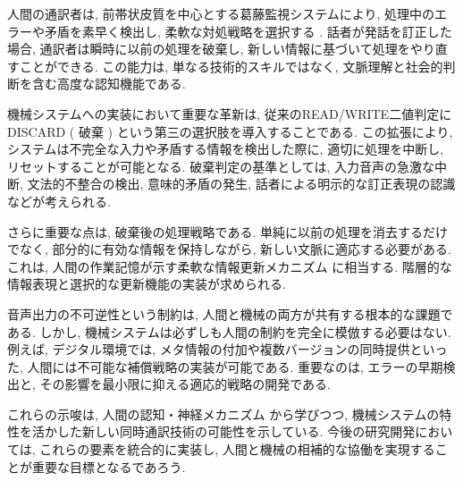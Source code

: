 人間の通訳者は, 前帯状皮質を中心とする葛藤監視システムにより, 処理中のエラーや矛盾を素早く検出し, 柔軟な対処戦略を選択する \cite{hervais2015fmri}.
話者が発話を訂正した場合, 通訳者は瞬時に以前の処理を破棄し, 新しい情報に基づいて処理をやり直すことができる.
この能力は, 単なる技術的スキルではなく, 文脈理解と社会的判断を含む高度な認知機能である.

機械システムへの実装において重要な革新は, 従来のREAD/WRITE二値判定にDISCARD ( 破棄 ) という第三の選択肢を導入することである.
この拡張により, システムは不完全な入力や矛盾する情報を検出した際に, 適切に処理を中断し, リセットすることが可能となる.
破棄判定の基準としては, 入力音声の急激な中断, 文法的不整合の検出, 意味的矛盾の発生, 話者による明示的な訂正表現の認識などが考えられる.

さらに重要な点は, 破棄後の処理戦略である.
単純に以前の処理を消去するだけでなく, 部分的に有効な情報を保持しながら, 新しい文脈に適応する必要がある.
これは, 人間の作業記憶が示す柔軟な情報更新メカニズム \cite{baddeley2000episodic} に相当する.
階層的な情報表現と選択的な更新機能の実装が求められる.

音声出力の不可逆性という制約は, 人間と機械の両方が共有する根本的な課題である.
しかし, 機械システムは必ずしも人間の制約を完全に模倣する必要はない.
例えば, デジタル環境では, メタ情報の付加や複数バージョンの同時提供といった, 人間には不可能な補償戦略の実装が可能である.
重要なのは, エラーの早期検出と, その影響を最小限に抑える適応的戦略の開発である.

これらの示唆は, 人間の認知・神経メカニズム \cite{gile1995basic,seeber2011cognitive,vandeputte2018anatomical} から学びつつ, 機械システムの特性を活かした新しい同時通訳技術の可能性を示している.
今後の研究開発においては, これらの要素を統合的に実装し, 人間と機械の相補的な協働を実現することが重要な目標となるであろう.